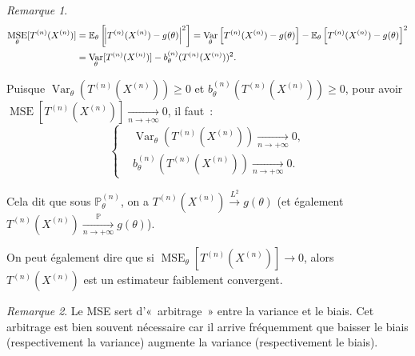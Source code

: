 \documentclass{report}
\DeclareMathOperator{\Var}{Var}
\DeclareMathOperator{\MSE}{MSE}
\renewcommand{\P}{\mathbb P}
\newcommand{\E}{\mathbb E}
\newcommand{\pinfty}{{+\infty}}
\newcommand{\cvgp}{\xrightarrow[n \to \pinfty]{\P}}
\newcommand{\n}{{(n)}}
\newcommand{\Xn}{{X^\n}}
\newcommand{\Tn}{{T^\n}}
\newcommand{\TnXn}{{\Tn(\Xn)}}
\theoremstyle{definition}
\theoremstyle{remark}
\newtheorem*{rmq}{Remarque}
\begin{document}
			\begin{rmq}
			\begin{align*}
				\MSE_\theta[\TnXn] &= \E_\theta\left[\abs {\TnXn - g(\theta)}^2\right]
					= \Var_\theta\left[\TnXn - g(\theta)\right] - \E_\theta\left[\TnXn - g(\theta)\right]^2 \\
				&= \Var_\theta[\TnXn] - b_\theta^{(n)}(\TnXn)^2.
			\end{align*}

			Puisque $\Var_\theta(\TnXn) \geq 0$ et $b_\theta^{(n)}(\TnXn) \geq 0$, pour avoir $\MSE[\TnXn] \xrightarrow[n \to \pinfty]{} 0$, il faut~:
			\[\begin{cases}&\Var_\theta(\TnXn) \xrightarrow[n \to \pinfty]{} 0, \\&b_\theta^{(n)}(\TnXn) \xrightarrow[n \to \pinfty]{} 0.\end{cases}\]

			Cela dit que sous $\P_\theta^{(n)}$, on a $\TnXn \xrightarrow{L^2} g(\theta)$ (et également $\TnXn \cvgp g(\theta)$).

			On peut également dire que si $\MSE_\theta[\TnXn] \to 0$, alors $\TnXn$ est un estimateur faiblement convergent.
			\end{rmq}

			\begin{rmq} Le MSE sert d'«~arbitrage~» entre la variance et le biais. Cet arbitrage est bien souvent nécessaire car il arrive fréquemment que baisser
			le biais (respectivement la variance) augmente la variance (respectivement le biais).
			\end{rmq}
\end{document}
